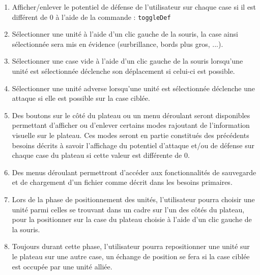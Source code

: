 \documentclass[a4paper]{report}
\begin{document}
\begin{enumerate}
\item Afficher/enlever le potentiel de défense de l'utilisateur sur chaque case si il est différent de 0 à l'aide de la commande : \texttt{toggleDef}

\item Sélectionner une unité à l'aide d'un clic gauche de la souris, la case ainsi sélectionnée sera mis en évidence (surbrillance, bords plus gros, ...).

\item Sélectionner une case vide à l'aide d'un clic gauche de la souris lorsqu'une unité est sélectionnée déclenche son déplacement si celui-ci est possible.

\item Sélectionner une unité adverse lorsqu'une unité est sélectionnée déclenche une attaque si elle est possible sur la case ciblée.


\item Des boutons sur le côté du plateau ou un menu déroulant seront disponibles permettant d'afficher ou d'enlever certains modes rajoutant de l'information visuelle sur le plateau. Ces modes seront en partie constitués des précédents besoins décrits à savoir l'affichage du potentiel d'attaque et/ou de défense sur chaque case du plateau si cette valeur est différente de 0.

\item Des menus déroulant permettront d'accéder aux fonctionnalités de sauvegarde et de chargement d'un fichier comme décrit dans les besoins primaires.

\item Lors de la phase de positionnement des unités, l'utilisateur pourra choisir une unité parmi celles se trouvant dans un cadre sur l'un des côtés du plateau, pour la positionner sur la case du plateau choisie à l'aide d'un clic gauche de la souris.

\item Toujours durant cette phase, l'utilisateur pourra repositionner une unité sur le plateau sur une autre case, un échange de position se fera si la case ciblée est occupée par une unité alliée.



\end{enumerate}
\end{document}
